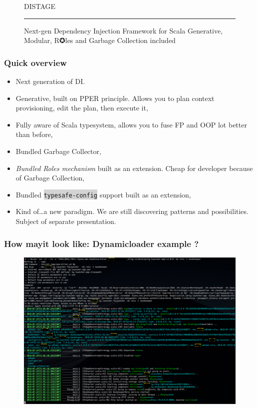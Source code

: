 \documentclass[usenames,dvipsnames]{beamer}
\newcommand{\code}[1]{\colorbox{lightgray}{\texttt{#1}}}
\begin{document}
\begin{frame}
\begin{figure}
\Huge 
\color{RubineRed} DISTAGE
\noindent
{\color{RubineRed} \rule{\linewidth}{1mm} }
\Large Next-gen Dependency Injection Framework for Scala
\normalsize Generative, Modular, R✪les and Garbage Collection included 
\end{figure}
\end{frame}

\begin{frame}
\frametitle{Quick overview}
\begin{itemize}
\item Next generation of DI.
\item Generative, built on PPER principle. Allows you to plan context provisioning, edit the plan, then execute it,
\item Fully aware of Scala typesystem, allows you to fuse FP and OOP lot better than before, 
\item Bundled Garbage Collector,
\item \textit{Bundled Roles mechanism} built as an extension. Cheap for developer because of Garbage Collection,
\item Bundled \code{typesafe-config} support built as an extension,
\item Kind of\dots a new paradigm. We are still discovering patterns and possibilities. Subject of separate presentation.
\end{itemize}
\end{frame}

\begin{frame}
\frametitle{How may\footnotemark[1] it look like: Dynamic\footnotemark[2] loader example ?}
\end{frame}

\begin{frame}
\begin{figure}
    \includegraphics[width=\textwidth]{media/roles-example.png}
\end{figure}
\end{frame}
\end{document}
